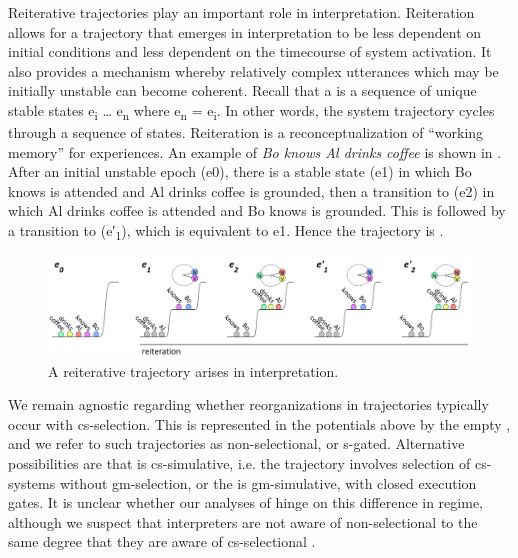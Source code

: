   Reiterative trajectories play an important role in interpretation. Reiteration allows for a trajectory that emerges in interpretation to be less dependent on initial conditions and less dependent on the timecourse of system activation. It also provides a mechanism whereby relatively complex utterances which may be initially unstable can become coherent. Recall that a  is a sequence of unique stable states e\textsubscript{i} … e\textsubscript{n} where e\textsubscript{n} = e\textsubscript{i}. In other words, the system trajectory cycles through a sequence of states. Reiteration is a reconceptualization of “working memory” for  experiences. An example  of \textit{Bo knows Al drinks coffee} is shown in {}. After an initial unstable epoch (e0), there is a stable state (e1) in which {\textbar}Bo knows{\textbar} is attended and {\textbar}Al drinks coffee{\textbar} is grounded, then a transition to (e2) in which {\textbar}Al drinks coffee{\textbar} is attended and {\textbar}Bo knows{\textbar} is grounded. This is followed by a transition to (e′\textsubscript{1}), which is equivalent to e1. Hence the trajectory is .

  
\begin{figure}
\includegraphics[width=\textwidth]{figures/Tilsen-img122.png}
\caption{A reiterative trajectory arises in interpretation.}
\label{fig:6:3}
\end{figure}
 

  We remain agnostic regarding whether reorganizations in  trajectories typically occur with cs-selection. This is represented in the potentials above by the empty , and we refer to such trajectories as non-selectional, or s-gated. Alternative possibilities are that  is cs-simulative, i.e. the trajectory involves selection of cs-systems without gm-selection, or the  is gm-simulative, with closed execution gates. It is unclear whether our analyses of  hinge on this difference in regime, although we suspect that interpreters are not aware of non-selectional  to the same degree that they are aware of cs-selectional .  

